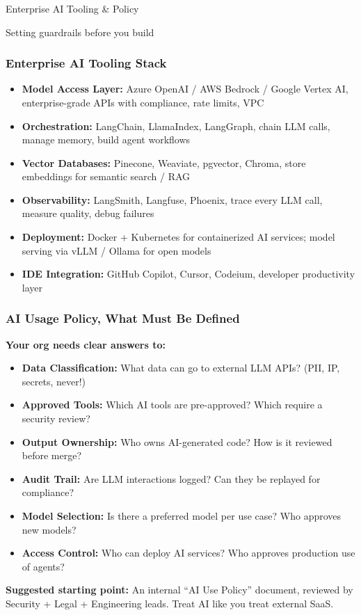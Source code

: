 \begin{frame}[fragile]\frametitle{}
\begin{center}
{\Large Enterprise AI Tooling \& Policy}

{\small Setting guardrails before you build}
\end{center}
\end{frame}

\begin{frame}[fragile]\frametitle{Enterprise AI Tooling Stack}
\begin{itemize}
\item \textbf{Model Access Layer:}
  Azure OpenAI / AWS Bedrock / Google Vertex AI, enterprise-grade APIs with compliance, rate limits, VPC
\item \textbf{Orchestration:}
  LangChain, LlamaIndex, LangGraph, chain LLM calls, manage memory, build agent workflows
\item \textbf{Vector Databases:}
  Pinecone, Weaviate, pgvector, Chroma, store embeddings for semantic search / RAG
\item \textbf{Observability:}
  LangSmith, Langfuse, Phoenix, trace every LLM call, measure quality, debug failures
\item \textbf{Deployment:}
  Docker + Kubernetes for containerized AI services; model serving via vLLM / Ollama for open models
\item \textbf{IDE Integration:}
  GitHub Copilot, Cursor, Codeium, developer productivity layer
\end{itemize}
\end{frame}

\begin{frame}[fragile]\frametitle{AI Usage Policy, What Must Be Defined}
\textbf{Your org needs clear answers to:}
\begin{itemize}
\item \textbf{Data Classification:} What data can go to external LLM APIs? (PII, IP, secrets, never!)
\item \textbf{Approved Tools:} Which AI tools are pre-approved? Which require a security review?
\item \textbf{Output Ownership:} Who owns AI-generated code? How is it reviewed before merge?
\item \textbf{Audit Trail:} Are LLM interactions logged? Can they be replayed for compliance?
\item \textbf{Model Selection:} Is there a preferred model per use case? Who approves new models?
\item \textbf{Access Control:} Who can deploy AI services? Who approves production use of agents?
\end{itemize}

\textbf{Suggested starting point:} An internal ``AI Use Policy'' document, reviewed by Security + Legal + Engineering leads. Treat AI like you treat external SaaS.
\end{frame}

